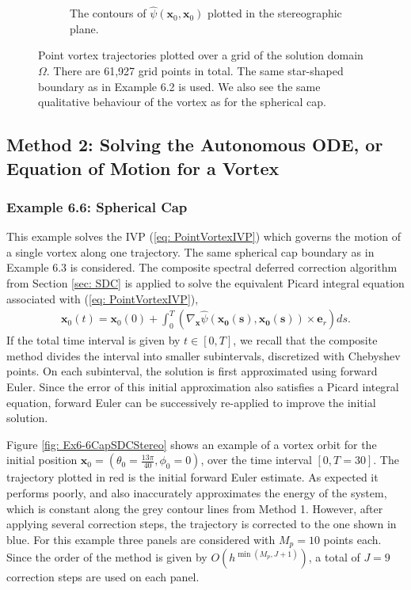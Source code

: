 \documentclass{sfuthesis}
\begin{document}
\begin{figure}[h]
\begin{subfigure}[b]{0.4\textwidth}
                	\caption{ The contours of $\hat{\psi}(\mathbf{x}_0, \mathbf{x}_0)$ plotted in the stereographic plane.}
        \end{subfigure}
         \caption{Point vortex trajectories plotted over a grid of the solution domain $\Omega$. There are 61,927 grid points in total. The same star-shaped boundary as in Example 6.2 is used. We also see the same qualitative behaviour of the vortex as for the spherical cap.}
      	\label{fig: Ex6-5StarTrajectory}
\end{figure}

\subsection{Method 2: Solving the Autonomous ODE, or Equation of Motion for a Vortex}
\label{sec: Method2NumericalResults}
\subsubsection{Example 6.6: Spherical Cap}
This example solves the IVP (\ref{eq: PointVortexIVP}) which governs the motion of a single vortex along one trajectory. The same spherical cap boundary as in Example 6.3 is considered. The composite spectral deferred correction algorithm from Section \ref{sec: SDC} is applied to solve the equivalent Picard integral equation associated with (\ref{eq: PointVortexIVP}), 
\begin{align*}
	\mathbf{x}_0(t)=\mathbf{x}_0(0) + \int_0^T \left( {\nabla}_\mathbf{x}\hat{\psi}(\mathbf{x_0(s)},\mathbf{x_0(s)}) \times {\mathbf{e}}_r \right) ds.
\end{align*}
If the total time interval is given by $t\in [0,T]$, we recall that the composite method divides the interval into smaller subintervals, discretized with Chebyshev points. On each subinterval, the solution is first approximated using forward Euler. Since the error of this initial approximation also satisfies a Picard integral equation, forward Euler can be successively re-applied to improve the initial solution. 

Figure \ref{fig: Ex6-6CapSDCStereo} shows an example of a vortex orbit for the initial position $\mathbf{x}_0=(\theta_0=\frac{13\pi}{40}, \phi_0=0)$, over the time interval $[0, T=30]$. The trajectory plotted in red is the initial forward Euler estimate. As expected it performs poorly, and also inaccurately approximates the energy of the system, which is constant along the grey contour lines from Method 1. However, after applying several correction steps, the trajectory is corrected to the one shown in blue. For this example three panels are considered with $M_p=10$ points each. Since the order of the method is given by $O(h^{\min(M_p, J+1)})$, a total of $J=9$ correction steps are used on each panel. 
\end{document}
